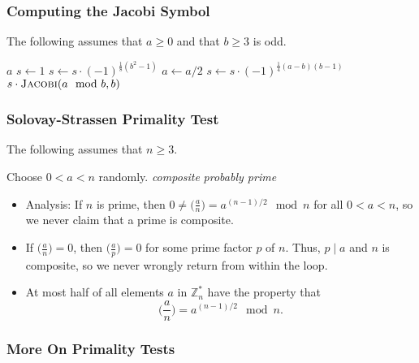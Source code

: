 \documentclass[a4paper]{scrartcl}
\begin{document}
\subsubsection*{Computing the Jacobi Symbol}

The following assumes that $a \geq 0$ and that $b \geq 3$ is odd.

\begin{algorithmic}[1]
\State \Return $a$
\EndIf
\State $s \gets 1$
\State $s \gets s \cdot (-1)^{\frac{1}{8}(b^2-1)}$
\State $a \gets a/2$
\EndWhile
{}
\State {}
\State $s \gets s \cdot (-1)^{\frac{1}{4}(a-b)(b-1)}$
\EndIf
\State \Return $s \cdot \Call{Jacobi}{a \mod b, b}$
\EndProcedure
\end{algorithmic}

\subsubsection*{Solovay-Strassen Primality Test}

The following assumes that $n \geq 3$.

\begin{algorithmic}[1]
\State Choose $0 < a < n$ randomly.
\State \Return \textit{composite}
\EndIf
\EndFor
\State \Return \textit{probably prime}
\EndProcedure
\end{algorithmic}

\begin{itemize}
\item Analysis: If $n$ is prime, then $0 \neq \big(\frac{a}{n}\big) = a^{(n-1)/2} \mod n$ for all $0 < a < n$, so we never claim that a prime is composite.
\item If $\big(\frac{a}{n}\big) = 0$, then $\big(\frac{a}{p}\big) = 0$ for some prime factor $p$ of $n$. Thus, $p \mid a$ and $n$ is composite, so we never wrongly return from within the loop.
\item At most half of all elements $a$ in  $\mathbb{Z}_n^*$ have the property that $$\bigg(\frac{a}{n}\bigg) = a^{(n-1)/2} \mod n.$$
\end{itemize}

\subsubsection*{More On Primality Tests}
\end{document}
